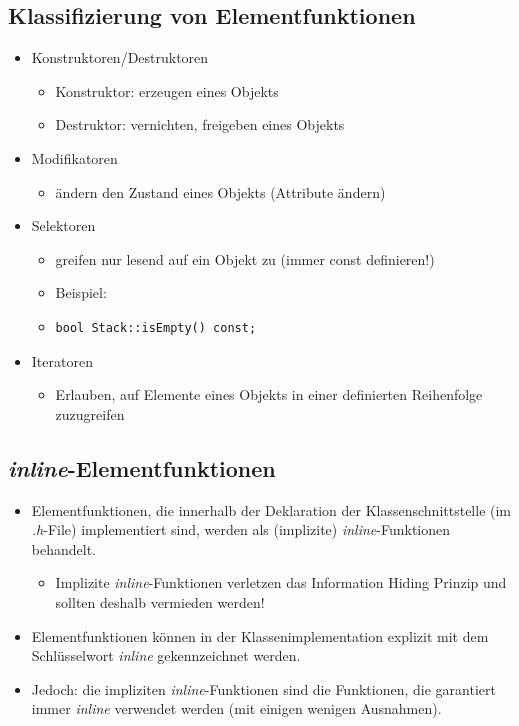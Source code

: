 \subsection{Klassifizierung von Elementfunktionen}
\begin{itemize}
	\item Konstruktoren/Destruktoren
	\begin{itemize}
		\item Konstruktor: erzeugen eines Objekts
		\item Destruktor: vernichten, freigeben eines Objekts
	\end{itemize}
	\item Modifikatoren
	\begin{itemize}
		\item ändern den Zustand eines Objekts (Attribute ändern)
	\end{itemize}
	\item Selektoren
	\begin{itemize}
		\item greifen nur lesend auf ein Objekt zu (immer const definieren!)
		\item Beispiel:
		\item[\-]
	\begin{minipage}{0.4\linewidth}
\vspace{-\baselineskip} 
\begin{lstlisting}
bool Stack::isEmpty() const;
\end{lstlisting}
	\end{minipage}
	\end{itemize}
	\item Iteratoren
	\begin{itemize}
		\item Erlauben, auf Elemente eines Objekts in einer definierten Reihenfolge zuzugreifen
	\end{itemize}
\end{itemize}

\subsection{\emph{inline}-Elementfunktionen}
\begin{itemize}
	\item Elementfunktionen, die innerhalb der Deklaration der Klassenschnittstelle (im \emph{.h}-File) implementiert sind, werden als (implizite) \emph{inline}-Funktionen behandelt.
	\begin{itemize}
		\item Implizite \emph{inline}-Funktionen verletzen das Information Hiding Prinzip und sollten deshalb vermieden werden!
	\end{itemize}
	\item Elementfunktionen können in der Klassenimplementation explizit mit dem Schlüsselwort \emph{inline} gekennzeichnet werden.
	\item Jedoch: die impliziten \emph{inline}-Funktionen sind die Funktionen, die garantiert immer \emph{inline} verwendet werden (mit einigen wenigen Ausnahmen).
\end{itemize}


